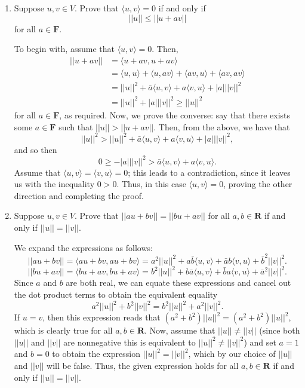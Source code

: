 \documentclass{book}
\begin{document}
\begin{enumerate}
\item Suppose \(u,v \in V\).  Prove that \(\langle u,v \rangle = 0\) if and only if \[||u|| \leq ||u+av||\] for all \(a \in \textbf{F}\).

To begin with, assume that \(\langle u,v \rangle = 0\).  Then,
\begin{equation*}
\begin{split}
||u+av||&=\langle u+av,u+av \rangle \\
&= \langle u,u \rangle + \langle u,av \rangle+\langle av,u \rangle + \langle av,av \rangle \\
&= ||u||^2 + \bar{a} \langle u,v \rangle + a \langle v,u \rangle + |a|||v||^2 \\
&= ||u||^2 + |a|||v||^2 \geq ||u||^2
\end{split}
\end{equation*}
for all \(a \in \textbf{F}\), as required.  Now, we prove the converse: say that there exists some \(a \in \textbf{F}\) such that \(||u||>||u+av||\).  Then, from the above, we have that \[||u||^2>||u||^2 + \bar{a} \langle u,v \rangle + a \langle v,u \rangle + |a|||v||^2,\] and so then \[0 \geq -|a|||v||^2 > \bar{a} \langle u,v \rangle + a \langle v,u \rangle.\] Assume that \(\langle u,v \rangle = \langle v,u \rangle = 0\); this leads to a contradiction, since it leaves us with the inequality \(0>0\).  Thus, in this case \(\langle u,v \rangle = 0\), proving the other direction and completing the proof.

\item Suppose \(u,v \in V\).  Prove that \(||au+bv||=||bu+av||\) for all \(a,b \in \textbf{R}\) if and only if \(||u||=||v||\).

We expand the expressions as follows: \[||au+bv||=\langle au+bv,au+bv \rangle = a^2||u||^2+a\bar{b} \langle u,v \rangle + \bar{a}b\langle v,u \rangle + \bar{b}^2 ||v||^2.\] \[||bu+av||=\langle bu+av,bu+av \rangle = b^2||u||^2+b\bar{a} \langle u,v \rangle + \bar{b}a\langle v,u \rangle + \bar{a}^2 ||v||^2.\]
Since \(a\) and \(b\) are both real, we can equate these expressions and cancel out the dot product terms to obtain the equivalent equality \[a^2||u||^2+b^2||v||^2=b^2||u||^2+a^2||v||^2.\] If \(u=v\), then this expression reads that \((a^2+b^2)||u||^2=(a^2+b^2)||u||^2\), which is clearly true for all \(a,b \in \textbf{R}\).  Now, assume that \(||u|| \neq ||v||\) (since both \(||u||\) and \(||v||\) are nonnegative this is equivalent to \(||u||^2 \neq ||v||^2\)) and set \(a=1\) and \(b=0\) to obtain the expression \(||u||^2=||v||^2\), which by our choice of \(||u||\) and \(||v||\) will be false.  Thus, the given expression holds for all \(a,b \in \textbf{R}\) if and only if \(||u||=||v||\).


\end{enumerate}
\end{document}
